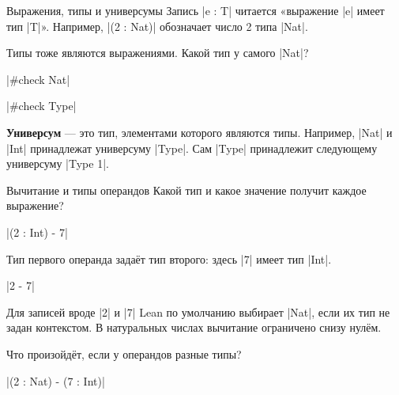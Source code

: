 \documentclass[aspectratio=169]{beamer}
\begin{document}
\begin{frame}[fragile]{Выражения, типы и универсумы}
Запись \leaninline|e : T| читается «выражение \leaninline|e| имеет тип \leaninline|T|». Например, \leaninline|(2 : Nat)| обозначает число 2 типа \leaninline|Nat|.

Типы тоже являются выражениями. Какой тип у самого \leaninline|Nat|?

\leaninline|#check Nat| \qquad {}

\leaninline|#check Type| \qquad {}

\textbf{Универсум} — это тип, элементами которого являются типы. Например, \leaninline|Nat| и \leaninline|Int| принадлежат универсуму \leaninline|Type|. Сам \leaninline|Type| принадлежит следующему универсуму \leaninline|Type 1|.

\end{frame}

\begin{frame}[fragile]{Вычитание и типы операндов}
Какой тип и какое значение получит каждое выражение?

\leaninline|(2 : Int) - 7|

Тип первого операнда задаёт тип второго: здесь \leaninline|7| имеет тип \leaninline|Int|.

\leaninline|2 - 7|

Для записей вроде \leaninline|2| и \leaninline|7| Lean по умолчанию выбирает \leaninline|Nat|, если их тип не задан контекстом. В натуральных числах вычитание ограничено снизу нулём.

Что произойдёт, если у операндов разные типы?

\leaninline|(2 : Nat) - (7 : Int)|

\end{frame}
\end{document}
